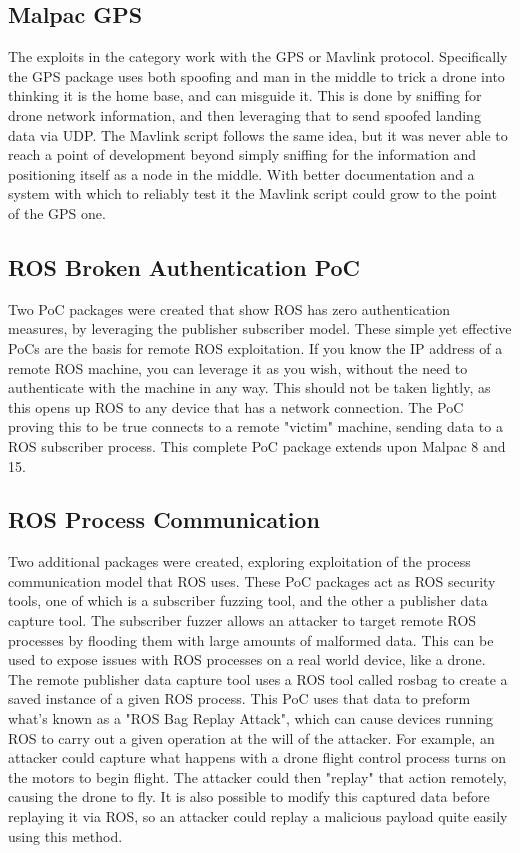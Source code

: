 \documentclass[IEEEtran,letterpaper,10pt,notitlepage,draftclsnofoot,onecolumn]{article}
\begin{document}
\subsection{Malpac GPS}
The exploits in the category work with the GPS or Mavlink protocol.
Specifically the GPS package uses both spoofing and man in the middle to trick a drone into thinking it is the home base, and can misguide it.
This is done by sniffing for drone network information, and then leveraging that to send spoofed landing data via UDP.
The Mavlink script follows the same idea, but it was never able to reach a point of development beyond simply sniffing for the information and positioning itself as a node in the middle.
With better documentation and a system with which to reliably test it the Mavlink script could grow to the point of the GPS one.

\subsection{ROS Broken Authentication PoC}
Two PoC packages were created that show ROS has zero authentication measures, by leveraging the publisher subscriber model.
These simple yet effective PoCs are the basis for remote ROS exploitation. If you know the IP address of a remote ROS machine, you can leverage it as you wish, without the need
to authenticate with the machine in any way. This should not be taken lightly, as this opens up ROS to any device that has a network connection. The PoC proving this to be true
connects to a remote "victim" machine, sending data to a ROS subscriber process. This complete PoC package extends upon Malpac 8 and 15.

\subsection{ROS Process Communication}
Two additional packages were created, exploring exploitation of the process communication model that ROS uses. These PoC packages act as ROS security tools, one of which is a subscriber
fuzzing tool, and the other a publisher data capture tool. The subscriber fuzzer allows an attacker to target remote ROS processes by flooding them with large amounts of malformed data.
This can be used to expose issues with ROS processes on a real world device, like a drone. The remote publisher data capture tool uses a ROS tool called rosbag to create a saved instance
of a given ROS process. This PoC uses that data to preform what's known as a "ROS Bag Replay Attack", which can cause devices running ROS to carry out a given operation at the will of the attacker.
For example, an attacker could capture what happens with a drone flight control process turns on the motors to begin flight. The attacker could then "replay" that action remotely, causing the drone
to fly. It is also possible to modify this captured data before replaying it via ROS, so an attacker could replay a malicious payload quite easily using this method.
\end{document}
